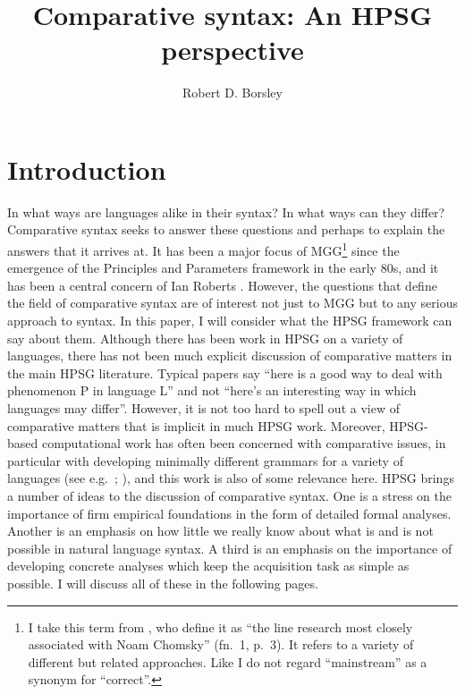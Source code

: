 \documentclass[output=paper]{langsci/langscibook}
\author{Robert D. Borsley\affiliation{University of Essex and Bangor University}}
\title{Comparative syntax: An HPSG perspective}
\begin{document}
\glsresetall

\section{Introduction}

In what ways are languages alike in their syntax? In what ways can they differ?
Comparative syntax seeks to answer these questions and perhaps to explain the
answers that it arrives at. It has been a major focus of \gls{MGG}\footnote{I
    take this term from \citet{CulJac2005}, who define it as \enquote{the line
    research most closely associated with Noam Chomsky} (fn.\ 1, p.\ 3). It refers
    to a variety of different but related approaches. Like
    \citeauthor{CulJac2005} I do not regard \enquote{mainstream} as a synonym for
\enquote{correct}.} since the emergence of the Principles and Parameters framework in
the early 80s, and it has been a central concern of Ian Roberts \parencite[see
e.g.][]{Roberts1997,Roberts2007}. However, the questions that define the field
of comparative syntax are of interest not just to \gls{MGG} but to any serious
approach to syntax. In this paper, I will consider what the \gls{HPSG}
framework can say about them. Although there has been work in \gls{HPSG} on a
variety of languages, there has not been much explicit discussion of
comparative matters in the main \gls{HPSG} literature. Typical papers say
\enquote{here is a good way to deal with phenomenon P in language L} and not
\enquote{here’s an interesting way in which languages may differ}. However, it
is not too hard to spell out a view of comparative matters that is implicit in
much \gls{HPSG} work.  Moreover, \gls{HPSG}-based computational work has often
been concerned with comparative issues, in particular with developing minimally
different grammars for a variety of languages (see e.g.~\citealt{Muller2015};
\citealt{BenDreFokPouSal2010,Bender2016}), and this work is also of some relevance
here. \gls{HPSG} brings a number of ideas to the discussion of comparative
syntax. One is a stress on the importance of firm empirical foundations in the
form of detailed formal analyses. Another is an emphasis on how little we
really know about what is and is not possible in natural language syntax. A
third is an emphasis on the importance of developing concrete analyses which
keep the acquisition task as simple as possible. I will discuss all of these in
the following pages.
\end{document}
